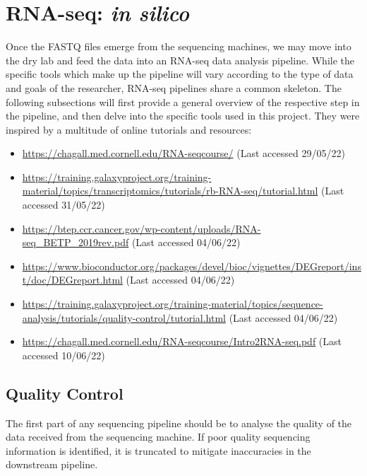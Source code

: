 \clearpage
\section{RNA-seq: \textit{in silico}}
\label{RNA-seq: in silico}

Once the FASTQ files emerge from the sequencing machines, we may move into the dry lab and feed the data into an RNA-seq data analysis pipeline. While the specific tools which make up the pipeline will vary according to the type of data and goals of the researcher, RNA-seq pipelines share a common skeleton. The following subsections will first provide a general overview of the respective step in the pipeline, and then delve into the specific tools used in this project. They were inspired by a multitude of online tutorials and resources:

\begin{itemize}\itemsep-0.5em
\item \url{https://chagall.med.cornell.edu/RNA-seqcourse/} (Last accessed 29/05/22)
\item \url{https://training.galaxyproject.org/training-material/topics/transcriptomics/tutorials/rb-RNA-seq/tutorial.html} (Last accessed 31/05/22)
\item \url{https://btep.ccr.cancer.gov/wp-content/uploads/RNA-seq_BETP_2019rev.pdf} (Last accessed 04/06/22)
\item \url{https://www.bioconductor.org/packages/devel/bioc/vignettes/DEGreport/inst/doc/DEGreport.html} (Last accessed 04/06/22)
\item \url{https://training.galaxyproject.org/training-material/topics/sequence-analysis/tutorials/quality-control/tutorial.html} (Last accessed 04/06/22)
\item \url{https://chagall.med.cornell.edu/RNA-seqcourse/Intro2RNA-seq.pdf} (Last accessed 10/06/22)
\end{itemize}


\subsection{Quality Control}

The first part of any sequencing pipeline should be to analyse the quality of the data received from the sequencing machine. If poor quality sequencing information is identified, it is truncated to mitigate inaccuracies in the downstream pipeline. 

